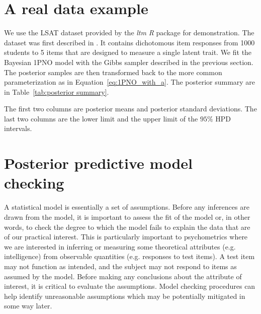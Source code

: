 \documentclass[floatsintext, man]{apa7}
\begin{document}
\section{A real data example}
We use the LSAT dataset provided by the \textit{ltm} \textit{R} package 
\parencite{rizopoulos_ltm_2015} for demonstration. The dataset was first described
in \textcite{bock_fitting_1970}. It contains dichotomous item responses from 1000
students to 5 items that are designed to measure a single latent trait. We fit
the Bayesian 1PNO model with the Gibbs sampler described in the previous
section. The posterior samples are then transformed back to the more common
parameterization as in Equation~\ref{eq:1PNO_with_a}. The posterior summary are
in Table~\ref{tab:posterior summary}.
\begin{table}[!htbp]
  \centering
\end{table}
The first two columns are posterior means and posterior standard deviations. The
last two columns are the lower limit and the upper limit of the $95\%$ HPD
intervals.

\section{Posterior predictive model checking}
A statistical model is essentially a set of assumptions. Before any inferences
are drawn from the model, it is important to assess the fit of the model or, in
other words, to check the degree to which the model fails to explain the data
that are of our practical interest. This is particularly important to
psychometrics where we are interested in inferring or measuring some theoretical
attributes (e.g. intelligence) from observable quantities (e.g. responses to
test items). A test item may not function as intended, and the subject may not
respond to items as assumed by the model. Before making any conclusions about
the attribute of interest, it is critical to evaluate the assumptions. Model
checking procedures can help identify unreasonable assumptions which may be
potentially mitigated in some way later.
\end{document}
